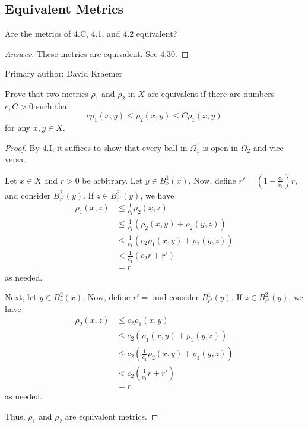\subsection{Equivalent Metrics}

\begin{minorEx}
    Are the metrics of 4.C, 4.1, and 4.2 equivalent?
\end{minorEx}

\begin{proof}[Answer]
    These metrics are equivalent. See 4.30. 
\end{proof}

Primary author: David Kraemer

\begin{minorEx}
    Prove that two metrics $\rho_1$ and $\rho_2$ in $X$ are equivalent if there
    are numbers $c, C > 0$ such that
    \[
        c \rho_1(x,y) \leq \rho_2(x,y) \leq C \rho_1(x,y)
    \]
    for any $x, y \in X$.
\end{minorEx}

\begin{proof}
    By 4.I, it suffices to show that every ball in $\Omega_1$ is open in
    $\Omega_2$ and vice versa.

    Let $x \in X$ and $r > 0$ be arbitrary. Let $y \in B_{r}^{1}(x)$. Now,
    define $r' = (1 - \tfrac{c_2}{c_1})r$, and consider $B_{r'}^{2}(y)$. If $z \in B_{r'}^{2}(y)$,
    we have
    \begin{align*}
        \rho_1(x,z) &\leq \tfrac{1}{c_1} \rho_2(x,z) \\
        &\leq \tfrac{1}{c_1} (\rho_2(x,y) + \rho_2(y,z)) \\
        &\leq \tfrac{1}{c_1} (c_2\rho_1(x,y) + \rho_2(y,z)) \\
        &< \tfrac{1}{c_1}(c_2 r + r') \\
        &= r
    \end{align*}
    as needed.

    Next, let $y \in B_{r}^{2}(x)$. Now, define $r' = $ and consider
    $B_{r'}^1(y)$. If $z \in B_{r'}^2(y)$, we have
    \begin{align*}
        \rho_2(x,z) &\leq c_2 \rho_1(x,y) \\
        &\leq c_2(\rho_1(x,y) + \rho_1(y,z)) \\
        &\leq c_2(\tfrac{1}{c_1}\rho_2(x,y) + \rho_1(y,z)) \\
        &< c_2 (\tfrac{1}{c_1} r + r') \\
        &= r
    \end{align*}
    as needed.

    Thus, $\rho_1$ and $\rho_2$ are equivalent metrics.
\end{proof}

